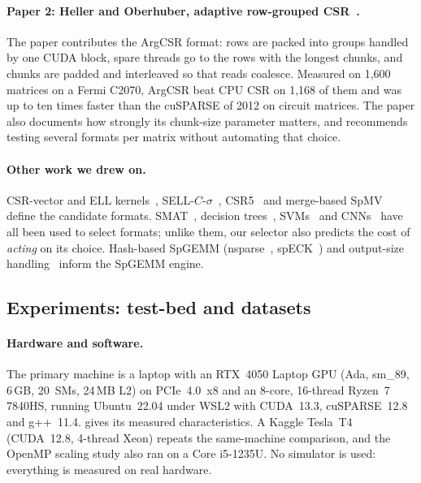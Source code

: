 \paragraph{Paper 2: Heller and Oberhuber, adaptive row-grouped CSR~\cite{heller2012argcsr}.} The paper contributes
the ArgCSR format: rows are packed into groups handled by one CUDA block, spare threads go to the rows with the
longest chunks, and chunks are padded and interleaved so that reads coalesce. Measured on 1,600 matrices on a Fermi
C2070, ArgCSR beat CPU CSR on 1,168 of them and was up to ten times faster than the cuSPARSE of 2012 on circuit
matrices. The paper also documents how strongly its chunk-size parameter matters, and recommends testing several
formats per matrix without automating that choice.

\paragraph{Other work we drew on.} CSR-vector and ELL kernels~\cite{bell2009spmv}, SELL-$C$-$\sigma$~\cite{kreutzer2014sell},
CSR5~\cite{liu2015csr5} and merge-based SpMV~\cite{merrill2016merge} define the candidate formats. SMAT~\cite{li2013smat},
decision trees~\cite{sedaghati2015selection}, SVMs~\cite{benatia2016svm} and CNNs~\cite{zhao2018cnn} have all been used to
select formats; unlike them, our selector also predicts the cost of \emph{acting} on its choice. Hash-based SpGEMM
(nsparse~\cite{nagasaka2017nsparse}, spECK~\cite{parger2020speck}) and output-size handling~\cite{liu2014spgemm} inform the
SpGEMM engine.

\subsection{Experiments: test-bed and datasets}\label{sec:testbed}
\paragraph{Hardware and software.} The primary machine is a laptop with an RTX~4050 Laptop GPU (Ada, sm\_89, 6\,GB,
20~SMs, 24\,MB L2) on PCIe~4.0~x8 and an 8-core, 16-thread Ryzen~7 7840HS, running Ubuntu~22.04 under WSL2 with CUDA~13.3,
cuSPARSE~12.8 and g++~11.4.  gives its measured characteristics. A Kaggle Tesla~T4 (CUDA~12.8, 4-thread
Xeon) repeats the same-machine comparison, and the OpenMP scaling study also ran on a Core i5-1235U. No simulator is
used: everything is measured on real hardware.

